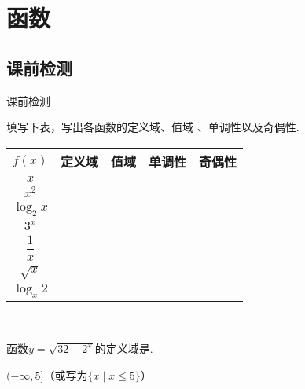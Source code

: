 \section{函数}
  \subsection{课前检测}\begin{exercise}{\heiti 课前检测}\\
    \item
      填写下表，写出各函数的定义域、值域 、单调性以及奇偶性.
      \begin{center}
        \renewcommand{\arraystretch}{1.4}
        \begin{tabular}{|c|c|c|c|c|}
          \hline
        $f(x)$&\mbox{\hspace{1.5em}定义域\hspace{1.5em}}&\mbox{\hspace{2em}值域\hspace{2em}}&\mbox{\hspace{8em}单调性\hspace{8em}}&\mbox{\hspace{1.2em}奇偶性\hspace{1.2em}}\\
          \hline
          $x$&&&&\\
          \hline
          $x^2$&&&&\\
          \hline
          $\log_2x$&&&&\\
          \hline
          $3^x$&&&&\\
          \hline
          $\dfrac{1}{x}$&&&&\\
          \hline
          $\sqrt{x}$&&&&\\
          \hline
          $\log_x2$&&&&\\
          \hline
        \end{tabular}\\
      \end{center}
    \item 函数$y=\sqrt{32-2^x}$的定义域是\tk.
      \begin{answer}
       $(-\infty,5]$（或写为$\{x\mid x\leqslant5\}$）


\end{answer}
\end{exercise}
